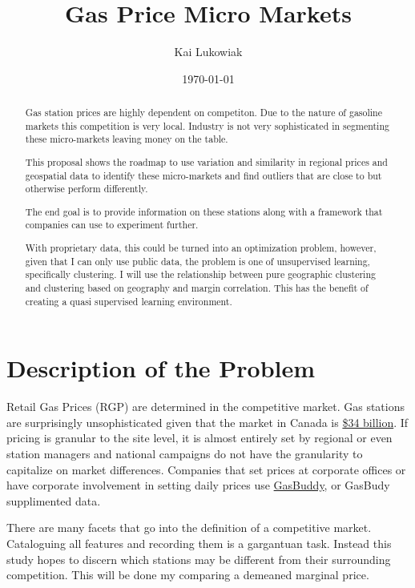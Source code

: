 \documentclass[11pt]{article}
\author{Kai Lukowiak}
\date{\today}
\title{Gas Price Micro Markets}
\begin{document}
\maketitle
\begin{abstract}

Gas station prices are highly dependent on competiton. Due to the nature of gasoline
markets this competition is very local. Industry is not very sophisticated in
segmenting these micro-markets leaving money on the table.

This proposal shows the roadmap to use variation and similarity in regional prices
and geospatial data to identify these micro-markets and find outliers that are
close to but otherwise perform differently.

The end goal is to provide information on these stations along with a framework
that companies can use to experiment further.

With proprietary data, this could be turned into an optimization problem,
however, given that I can only use public data, the problem is one of unsupervised
learning, specifically clustering. I will use the relationship between pure
geographic clustering and clustering based on geography and margin correlation.
This has the benefit of creating a quasi supervised learning environment.

\end{abstract}

\section{Description of the Problem}
\label{sec:org16d72e9}
Retail Gas Prices (RGP) are determined in the competitive market. Gas stations
are surprisingly unsophisticated given that the market in Canada is \href{https://www.ibisworld.ca/industry-trends/market-research-reports/retail-trade/gas-stations.html}{\$34 billion}.
If pricing is granular to the site level, it is almost entirely set by regional
or even station managers and national campaigns do not have the granularity to
capitalize on market differences. Companies that set prices at corporate offices
or have corporate involvement in setting daily prices use \href{https://www.gasbuddy.com/}{GasBuddy}, or GasBudy
supplimented data.

There are many facets that go into the definition of a competitive market.
Cataloguing all features and recording them is a gargantuan task. Instead this
study hopes to discern which stations may be different from their surrounding
competition. This will be done my comparing a demeaned marginal price.
\end{document}
